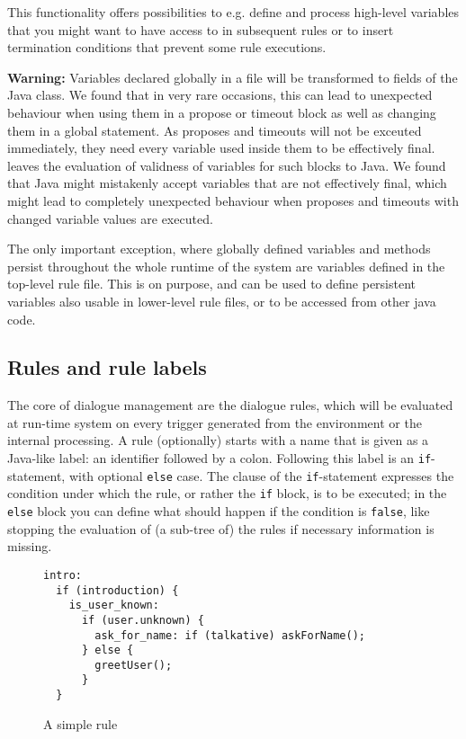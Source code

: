 This functionality offers possibilities to e.g. define and process high-level
variables that you might want to have access to in subsequent rules or to insert
termination conditions that prevent some rule executions.

\textbf{Warning:} Variables declared globally in a file will be
transformed to fields of the Java class. We found that in very rare
occasions, this can lead to unexpected behaviour when using them in a
propose or timeout block as well as changing them in a global
statement. As proposes and timeouts will not be exceuted immediately,
they need every variable used inside them to be effectively
final. \vonda leaves the evaluation of validness of variables for such
blocks to Java. We found that Java might mistakenly accept variables
that are not effectively final, which might lead to completely
unexpected behaviour when proposes and timeouts with changed variable
values are executed.

The only important exception, where globally defined variables and
methods persist throughout the whole runtime of the system are
variables defined in the top-level rule file. This is on purpose, and
can be used to define persistent variables also usable in lower-level
rule files, or to be accessed from other java code.

\subsection{Rules and rule labels}

The core of \vonda dialogue management are the dialogue rules, which will be
evaluated at run-time system on every trigger generated from the environment or
the internal processing.
A rule (optionally) starts with a name that is given as a Java-like label: an
identifier followed by a colon. Following this label is an
\texttt{if}-statement, with optional \texttt{else} case. The clause of the
\texttt{if}-statement expresses the condition under which the rule, or rather
the \texttt{if} block, is to be executed; in the \texttt{else} block you can
define what should happen if the condition is \texttt{false}, like stopping the
evaluation of (a sub-tree of) the rules if necessary information is missing.

\begin{figure}[htb]
\begin{small}
\begin{lstlisting}
intro:
  if (introduction) {
    is_user_known:
      if (user.unknown) {
        ask_for_name: if (talkative) askForName();
      } else {
        greetUser();
      }
  }
\end{lstlisting}
\end{small}\vspace{-2ex}
\caption{A simple rule}
\end{figure}

